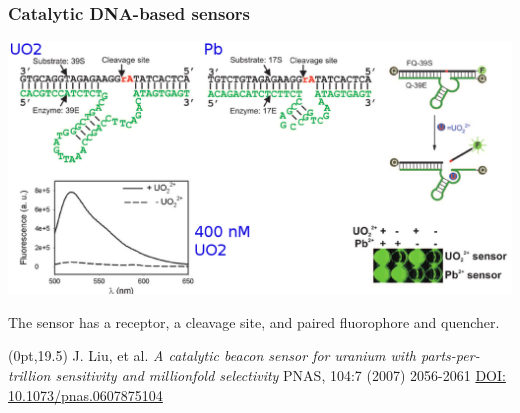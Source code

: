 \documentclass[10pt, xcolor=x11names, compress]{beamer}
\begin{document}
\begin{frame}
  \frametitle{Catalytic DNA-based sensors}

  \begin{center}
    \includegraphics[width=0.8\linewidth]{images/sensor.png}
  \end{center}

  \medskip

  The sensor has a {\color{Green4}receptor}, a {\color{red}cleavage
    site}, and paired fluorophore and quencher.

  \begin{textblock*}{0.7\linewidth}(0pt,19.5\TPVertModule)%
    \tiny J. Liu, et al. \textit{A catalytic beacon sensor for uranium
      with parts-per-trillion sensitivity and millionfold selectivity}
    PNAS, 104:7 (2007) 2056-2061
    \href{http://dx.doi.org/10.1073/pnas.0607875104}{\color{Blue4}DOI: 10.1073/pnas.0607875104}
  \end{textblock*}
\end{frame}
\end{document}
